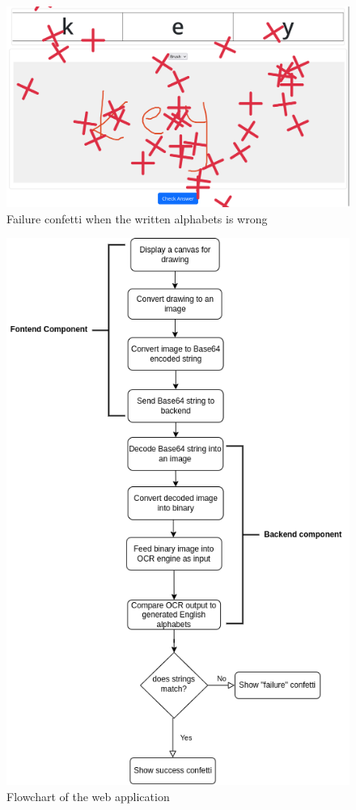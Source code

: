 \documentclass[twocolumn,oneside,12pt,a4paper]{article}
\begin{document}
\begin{figure}
    \centering
    \includegraphics[width=\linewidth]{../failure.png}
    \caption{Failure confetti when the written alphabets is wrong}
    \label{fig:failure_confetti}
\end{figure}

\begin{figure}
    \centering
    \includegraphics[width=\linewidth]{../flowchat.png}
    \caption{Flowchart of the web application}
    \label{fig:app_flowchat}
\end{figure}
\end{document}
